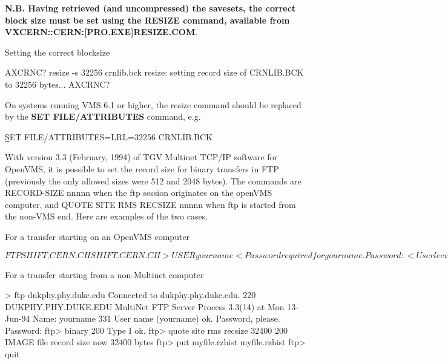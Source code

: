 {\bf N.B. Having retrieved (and uncompressed) the savesets,
the correct block size must be set using the RESIZE command,
available from VXCERN::CERN:[PRO.EXE]RESIZE.COM}.

\begin{XMPt}{Setting the correct blocksize}

AXCRNC? resize -s 32256 crnlib.bck
resize: setting record size of CRNLIB.BCK to 32256 bytes...
AXCRNC?

\end{XMPt}

On systems running VMS 6.1 or higher, the resize command
should be replaced by the {\bf SET FILE/ATTRIBUTES} command,
e.g.

{\underline SET FILE/ATTRIBUTES=LRL=32256 CRNLIB.BCK}


With version 3.3 (February, 1994) of TGV Multinet TCP/IP software for OpenVMS,
it is possible to set the record size for binary transfers in FTP (previously
the only allowed sizes were 512 and 2048 bytes).  The commands are
RECORD-SIZE nnnnn when the ftp session originates on the openVMS computer, and
QUOTE SITE RMS RECSIZE nnnnn when ftp is started from the non-VMS end.
Here are examples of the two cases.  

\begin{XMPt}{For a transfer starting on an OpenVMS computer}

$ FTP SHIFT.CERN.CH
SHIFT.CERN.CH> USER yourname
<Password required for yourname.
Password:
<User leeiv logged in.
SHIFT.CERN.CH> VERSION
DUKPHY.PHY.DUKE.EDU MultiNet FTP user process 3.3(109)
SHIFT.CERN.CH> BINARY
Type: Image, Structure: File, Mode: Stream
SHIFT.CERN.CH> RECORD-SIZE 32400
SHIFT.CERN.CH> RECORD-SIZE
Record size for IMAGE files: 32400
SHIFT.CERN.CH> GET myfile.rzhist myfile.rzhist
SHIFT.CERN.CH> QUIT
$

\end{XMPt}

\begin{XMPt}{For a transfer starting from a non-Multinet computer}

> ftp dukphy.phy.duke.edu
Connected to dukphy.phy.duke.edu.
220 DUKPHY.PHY.DUKE.EDU MultiNet FTP Server Process 3.3(14) at Mon 13-Jun-94
Name: yourname
331 User name (yourname) ok. Password, please.
Password:
ftp> binary
200 Type I ok.
ftp> quote site rms recsize 32400
200 IMAGE file record size now 32400 bytes
ftp> put myfile.rzhist myfile.rzhist
ftp> quit

\end{XMPt}

